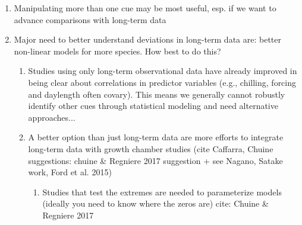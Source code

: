 \documentclass[11pt,letterpaper]{article}
\begin{document}
\begin{enumerate}
\begin{enumerate}
\begin{enumerate}
\end{enumerate}
\item Manipulating more than one cue may be most useful, esp. if we want to advance comparisons with long-term data
\item Major need to better understand deviations in long-term data are: better non-linear models for more species. How best to do this?
\begin{enumerate}
\item Studies using only long-term observational data have already improved in being clear about correlations in predictor variables (e.g., chilling, forcing and daylength often covary). This means we generally cannot robustly identify other cues through statistical modeling and need alternative approaches... %
\item A better option than just long-term data are more efforts to integrate long-term data with growth chamber studies (cite Caffarra, Chuine suggestions: chuine \& Regniere 2017 suggestion + see Nagano, Satake work, Ford et al. 2015) %
\begin{enumerate}
\item Studies that test the extremes are needed to parameterize models (ideally you need to know where the zeros are) cite:  Chuine \& Regniere 2017 %

\end{enumerate}
\end{enumerate}
\end{enumerate}
\end{enumerate}
\end{document}
